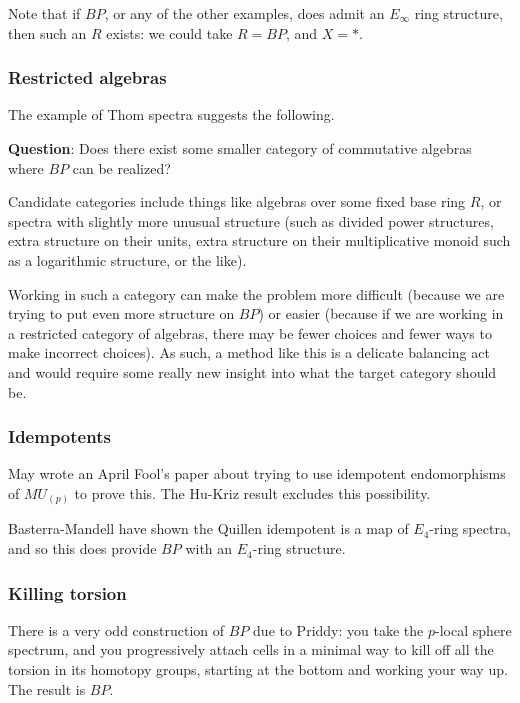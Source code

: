 \documentclass[12pt,titlepage]{article}
\theoremstyle{plain}
\theoremstyle{definition}
\theoremstyle{remark}
\begin{document}
Note that if $BP$, or any of the other examples, does admit an $E_\infty$ ring structure, then such an $R$ exists: we could take $R =
BP$, and $X = *$.

\hypertarget{restricted_algebras_9}{}\subsubsection{{Restricted algebras}}\label{restricted_algebras_9}

The example of Thom spectra suggests the following.

\textbf{Question}: Does there exist some smaller category of commutative algebras where $BP$ can be realized?

Candidate categories include things like algebras over some fixed base ring $R$, or spectra with slightly more unusual structure (such as divided power structures, extra structure on their units, extra structure on their multiplicative monoid such as a logarithmic structure, or the like).

Working in such a category can make the problem more difficult (because we are trying to put even more structure on $BP$) or easier (because if we are working in a restricted category of algebras, there may be fewer choices and fewer ways to make incorrect choices). As such, a method like this is a delicate balancing act and would require some really new insight into what the target category should be.

\hypertarget{idempotents_10}{}\subsubsection{{Idempotents}}\label{idempotents_10}

May wrote an April Fool'{}s paper about trying to use idempotent endomorphisms of $MU_{(p)}$ to prove this. The Hu-Kriz result excludes this possibility.

Basterra-Mandell have shown the Quillen idempotent is a map of $E_4$-ring spectra, and so this does provide $BP$ with an $E_4$-ring structure.

\hypertarget{killing_torsion_11}{}\subsubsection{{Killing torsion}}\label{killing_torsion_11}

There is a very odd construction of $BP$ due to Priddy: you take the $p$-local sphere spectrum, and you progressively attach cells in a minimal way to kill off all the torsion in its homotopy groups, starting at the bottom and working your way up. The result is $BP$.
\end{document}

